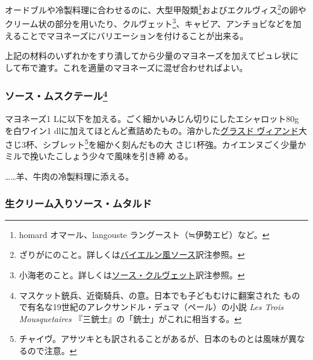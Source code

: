 \begin{recette}
オードブルや冷製料理に合わせるのに、大型甲殻類\footnote{homard
  オマール、langouste ラングースト（≒伊勢エビ）など。}およびエクルヴィス\footnote{ざりがにのこと。詳しくは\protect\hyperlink{sauce-bavaroise}{バイエルン風ソース}訳注参照。}の卵や
クリーム状の部分を用いたり、クルヴェット\footnote{小海老のこと。詳しくは\protect\hyperlink{sauce-aux-crevettes}{ソース・クルヴェット}訳注参照。}、キャビア、アンチョビなどを加
えることでマヨネーズにバリエーションを付けることが出来る。

上記の材料のいずれかをすり潰してから少量のマヨネーズを加えてピュレ状に
して布で漉す。これを適量のマヨネーズに混ぜ合わせればよい。

\hypertarget{sauce-mousquetaire}{%
\subsubsection[ソース・ムスクテール]{\texorpdfstring{ソース・ムスクテール\footnote{マスケット銃兵、近衛騎兵、の意。日本でも子どもむけに翻案された
  もので有名な19世紀のアレクサンドル・デュマ（ペール）の小説 \emph{Les
  Trois Mousquetaires} 『三銃士』の「銃士」がこれに相当する。}}{ソース・ムスクテール}}\label{sauce-mousquetaire}}



マヨネーズ1 Lに以下を加える。ごく細かいみじん切りにしたエシャロット80g
を白ワイン1\undemi{}
dlに加えてほとんど煮詰めたもの。溶かした\protect\hyperlink{glace-de-viande}{グラスド
ヴィアンド}大さじ3杯、シブレット\footnote{チャイヴ。アサツキとも訳されることがあるが、日本のものとは風味が異なるので注意。}を細かく刻んだもの大
さじ1杯強。カイエンヌごく少量かミルで挽いたこしょう少々で風味を引き締
める。

\ldots{}\ldots{}羊、牛肉の冷製料理に添える。

\hypertarget{sauce-moutarde-a-la-creme}{%
\subsubsection{生クリーム入りソース・ムタルド}\label{sauce-moutarde-a-la-creme}}



\end{recette}
